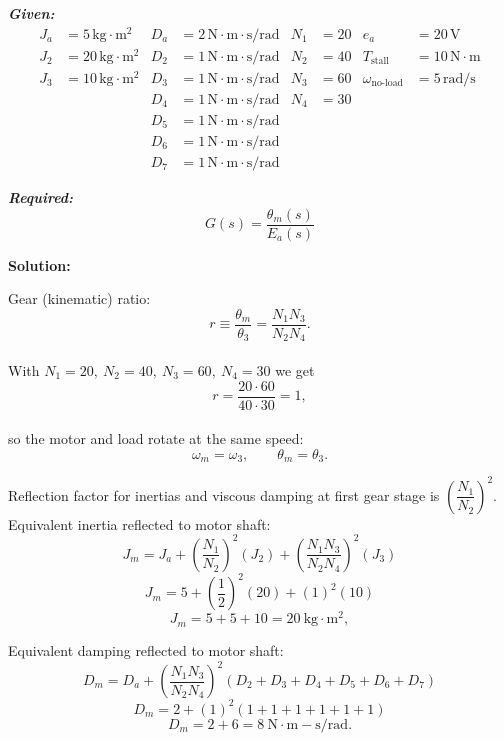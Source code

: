 ﻿\documentclass[11pt]{article}
\begin{document}
\vspace{12pt}

\noindent\textbf{\textit{Given:}}
\[
\begin{aligned}
J_a &= 5\, \text{kg}\cdot\text{m}^2 & D_a &= 2\, \text{N}\cdot\text{m}\cdot\text{s/rad} & N_1 &= 20 & e_a &= 20\,\text{V} \\
J_2 &= 20\, \text{kg}\cdot\text{m}^2 & D_2 &= 1\, \text{N}\cdot\text{m}\cdot\text{s/rad} & N_2 &= 40 & T_{\text{stall}} &= 10\,\text{N}\cdot\text{m} \\
J_3 &= 10\, \text{kg}\cdot\text{m}^2 & D_3 &= 1\, \text{N}\cdot\text{m}\cdot\text{s/rad} & N_3 &= 60 & \omega_{\text{no-load}} &= 5\,\text{rad/s} \\
& & D_4 &= 1\, \text{N}\cdot\text{m}\cdot\text{s/rad} & N_4 &= 30 & & \\
& & D_5 &= 1\, \text{N}\cdot\text{m}\cdot\text{s/rad} & & & & \\
& & D_6 &= 1\, \text{N}\cdot\text{m}\cdot\text{s/rad} & & & & \\
& & D_7 &= 1\, \text{N}\cdot\text{m}\cdot\text{s/rad} & & & &
\end{aligned}
\]

\vspace{12pt}

\noindent \textbf{\textit{Required:}}
\[
G(s) = \frac{\theta_m(s)}{E_a(s)}
\]

\vspace{12pt}

\noindent \textbf{Solution:}

Gear (kinematic) ratio:
\[
r \equiv \frac{\theta_m}{\theta_3}=\frac{N_1 N_3}{N_2 N_4}.
\]  \\

With \(N_1=20,\ N_2=40,\ N_3=60,\ N_4=30\) we get
\[
r=\frac{20 \cdot 60}{40 \cdot 30}=1,
\] \\

so the motor and load rotate at the same speed:
\[
\omega_m = \omega_3,\qquad \theta_m = \theta_3.
\]

Reflection factor for inertias and viscous damping at first gear stage is \(\left(\dfrac{N_1}{N_2}\right)^2\). \\

Equivalent inertia reflected to motor shaft:
\[
J_m = J_a + \left(\frac{N_1}{N_2}\right)^2 (J_2) + \left(\frac{N_1 N_3}{N_2 N_4}\right)^2 (J_3)
\]
\[
J_m = 5 + \left(\frac{1}{2}\right)^2 (20) + (1)^2 (10)
\]
\[
J_m = 5 + 5 + 10 = 20\ \mathrm{kg\cdot m^2},
\]

Equivalent damping reflected to motor shaft:
\[
D_m = D_a + \left(\frac{N_1 N_3}{N_2 N_4}\right)^2 (D_2 + D_3 + D_4 + D_5 + D_6 + D_7)
\]
\[
D_m = 2 + (1)^2 (1 + 1 + 1 + 1 + 1 + 1)
\]
\[
D_m = 2 + 6 = 8\ \mathrm{N\cdot m\!-\!s/rad}.
\]
\end{document}

